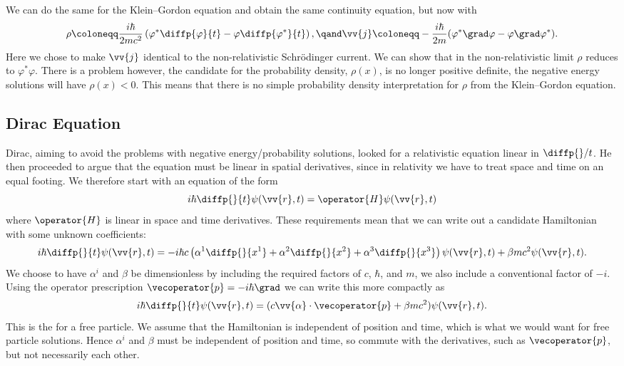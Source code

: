 We can do the same for the Klein--Gordon equation and obtain the same continuity equation, but now with
\begin{equation}
    \rho \coloneqq \frac{i\hbar}{2mc^2} \left( \varphi^* \diffp{\varphi}{t} - \varphi \diffp{\varphi^*}{t} \right), \qand \vv{j} \coloneqq -\frac{i\hbar}{2m}(\varphi^*\grad \varphi - \varphi\grad\varphi^*).
\end{equation}
Here we chose to make \(\vv{j}\) identical to the non-relativistic Schrödinger current.
We can show that in the non-relativistic limit \(\rho\) reduces to \(\varphi^*\varphi\).
There is a problem however, the candidate for the probability density, \(\rho(x)\), is no longer positive definite, the negative energy solutions will have \(\rho(x) < 0\).
This means that there is no simple probability density interpretation for \(\rho\) from the Klein--Gordon equation.

\subsection{Dirac Equation}
Dirac, aiming to avoid the problems with negative energy/probability solutions, looked for a relativistic equation linear in \(\diffp{}/{t}\).
He then proceeded to argue that the equation must be linear in spatial derivatives, since in relativity we have to treat space and time on an equal footing.
We therefore start with an equation of the form
\begin{equation}
    i\hbar\diffp{}{t}\psi(\vv{r}, t) = \operator{H}\psi(\vv{r}, t)
\end{equation}
where \(\operator{H}\) is linear in space and time derivatives.
These requirements mean that we can write out a candidate Hamiltonian with some unknown coefficients:
\begin{equation}
    i\hbar\diffp{}{t}\psi(\vv{r}, t) = -i\hbar c\left( \alpha^1\diffp{}{x^1} + \alpha^2\diffp{}{x^2} + \alpha^3\diffp{}{x^3} \right) \psi(\vv{r}, t) + \beta mc^2 \psi(\vv{r}, t).
\end{equation}
We choose to have \(\alpha^i\) and \(\beta\) be dimensionless by including the required factors of \(c\), \(\hbar\), and \(m\), we also include a conventional factor of \(-i\).
Using the operator prescription \(\vecoperator{p} = -i\hbar\grad\) we can write this more compactly as
\begin{equation}
    i\hbar\diffp{}{t}\psi(\vv{r}, t) = (c\vv{\alpha} \cdot \vecoperator{p} + \beta mc^2) \psi(\vv{r}, t).
\end{equation}
This is the  for a free particle.
We assume that the Hamiltonian is independent of position and time, which is what we would want for free particle solutions.
Hence \(\alpha^i\) and \(\beta\) must be independent of position and time, so commute with the derivatives, such as \(\vecoperator{p}\), but not necessarily each other.

